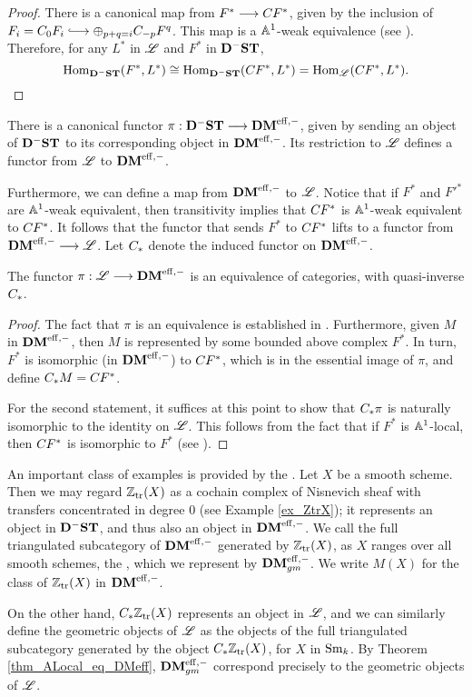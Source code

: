 \begin{proof}
There is a canonical map from $F^* \to \suslC[] F^*$,
given by the inclusion of $F_i = \suslC[0] F_i \into \oplus_{p + 
q = i} \suslC[-p] F^q$. This map is a $\A^1$-weak equivalence
(see \cite[14.4]{MVW}). Therefore, for any $L^*$ in $\ALocal$
and $F^*$ in $\DShCor$,
\[
\hom_{\DShCor}(F^*, L^*) \cong \hom_{\DShCor}(\suslC[] F^*, L^*)
   = \hom_{\ALocal}(\suslC[] F^*, L^*).
\qedhere
\]
\end{proof}

There is a canonical functor $\pi: \DShCor \to \DMeff$, given
by sending an object of $\DShCor$ to its corresponding object in
$\DMeff$. Its restriction to $\ALocal$ defines a functor from
$\ALocal$ to $\DMeff$.

Furthermore, we can define a map from $\DMeff$ to $\ALocal$. 
Notice that if $F^*$ and ${F'}^*$ are $\A^1$-weak equivalent, then
transitivity implies that $\suslC[] F^*$ is $\A^1$-weak equivalent 
to $\suslC[] F^*$. It follows that the functor that sends $F^*$
to $\suslC[] F^*$ lifts to a functor from $\DMeff \to \ALocal$.
Let $\suslC$ denote the induced functor on $\DMeff$.

\begin{thm}\label{thm_ALocal_eq_DMeff}
The functor $\pi: \ALocal \to \DMeff$ is an equivalence of 
categories, with quasi-inverse $\suslC$.
\end{thm}

\begin{proof}
The fact that $\pi$ is an equivalence is established in
\cite[14.11]{MVW}. Furthermore, given $M$ in
$\DMeff$, then $M$ is represented by some bounded above complex 
$F^*$. In turn, $F^*$ is isomorphic (in $\DMeff$) to $\suslC[] 
F^*$, which is in the essential image of $\pi$, and define
$\suslC M = \suslC[] F^*$. 

For the second statement, it suffices at this point to show that 
$\suslC \pi$ is naturally isomorphic to the identity on $\ALocal$. 
This follows from the fact that if $F^*$ is $\A^1$-local, then 
$\suslC[] F^*$ is isomorphic to $F^*$ (see \cite[14.9]{MVW}).
\end{proof}

\begin{ex}\label{ex_geo_obj}
An important class of examples is provided by the .  Let $X$ be a smooth scheme. Then we may regard $\Ztr(X)$ as
a cochain complex of Nisnevich sheaf with transfers concentrated in
degree 0 (see Example \ref{ex_ZtrX}); it represents an object in
$\DShCor$, and thus also an object in $\DMeff$. We call the full
triangulated subcategory of $\DMeff$ generated by $\Ztr(X)$, as $X$
ranges over all smooth schemes, the ,
which we represent by $\DMeffgm$. We write $M(X)$ for the class of
$\Ztr(X)$ in $\DMeff$.

On the other hand, $\suslC \Ztr(X)$ represents an object in $\ALocal$,
and we can similarly define the geometric objects of $\ALocal$ as the
objects of the full triangulated subcategory generated by the object
$\suslC \Ztr(X)$, for $X$ in $\Sm$. By Theorem
\ref{thm_ALocal_eq_DMeff}, $\DMeffgm$ correspond precisely to
the geometric objects of $\ALocal$.
\end{ex}

